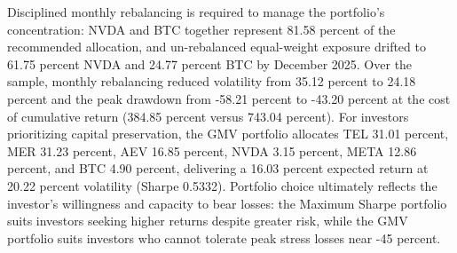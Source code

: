 Disciplined monthly rebalancing is required to manage the portfolio's concentration: NVDA and BTC together represent 81.58 percent of the recommended allocation, and un-rebalanced equal-weight exposure drifted to 61.75 percent NVDA and 24.77 percent BTC by December 2025. Over the sample, monthly rebalancing reduced volatility from 35.12 percent to 24.18 percent and the peak drawdown from -58.21 percent to -43.20 percent at the cost of cumulative return (384.85 percent versus 743.04 percent). For investors prioritizing capital preservation, the GMV portfolio allocates TEL 31.01 percent, MER 31.23 percent, AEV 16.85 percent, NVDA 3.15 percent, META 12.86 percent, and BTC 4.90 percent, delivering a 16.03 percent expected return at 20.22 percent volatility (Sharpe 0.5332). Portfolio choice ultimately reflects the investor's willingness and capacity to bear losses: the Maximum Sharpe portfolio suits investors seeking higher returns despite greater risk, while the GMV portfolio suits investors who cannot tolerate peak stress losses near -45 percent.
